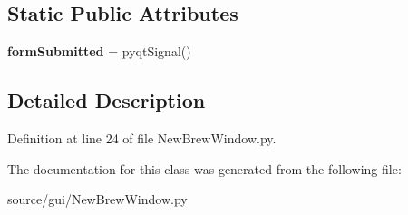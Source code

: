 \subsection*{Static Public Attributes}
\begin{DoxyCompactItemize}
\item 
\mbox{\label{class_new_brew_window_1_1_new_brew_window_a60eae64d7cf6bd51e2a784a7cd24549d}} 
{\bfseries form\+Submitted} = pyqt\+Signal()
\end{DoxyCompactItemize}


\subsection{Detailed Description}


Definition at line 24 of file New\+Brew\+Window.\+py.



The documentation for this class was generated from the following file\+:\begin{DoxyCompactItemize}
\item 
source/gui/New\+Brew\+Window.\+py\end{DoxyCompactItemize}
